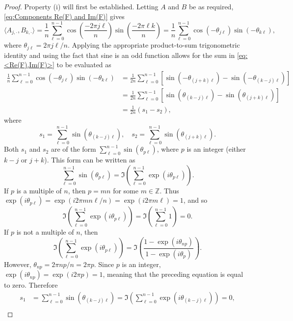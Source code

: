 \begin{proof}
Property (i) will first be established. Letting $A$ and $B$ be as required, \eqref{eq:Components Re(F) and Im(F)} gives
\begin{equation}
\langle A_{j,\cdot}, B_{k,\cdot}\rangle = \frac{1}{n}\sum_{\ell=0}^{n-1}\cos\left(\frac{-2\pi{j\ell}}{n}\right)\sin\left(\frac{-2\pi{\ell{k}}}{n}\right) = \frac{1}{n}\sum_{\ell=0}^{n-1}\cos\left(-\theta_{j\ell}\right)\sin\left(-\theta_{k\ell}\right),
\label{eq: <Re(F),Im(F)>}
\end{equation}
where $\theta_{j\ell} = 2\pi{j\ell}/n$. Applying the appropriate product-to-sum trigonometric identity and using the fact that sine is an odd function allows for the sum in \eqref{eq: <Re(F),Im(F)>} to be evaluated as
\begin{align*}
\frac{1}{n}\sum_{\ell=0}^{n-1}\cos\left(-\theta_{j\ell}\right)\sin\left(-\theta_{k\ell}\right) &= \frac{1}{2n}\sum_{\ell=0}^{n-1}\left[\sin\left(-\theta_{(j+k)\ell}\right) - \sin\left(-\theta_{(k-j)\ell}\right)\right] \\
&= \frac{1}{2n}\sum_{\ell=0}^{n-1}\left[\sin\left(\theta_{(k-j)\ell}\right) - \sin\left(\theta_{(j+k)\ell}\right)\right] \\
&= \frac{1}{2n}\left(s_1 - s_2\right),
\end{align*}
where
\[s_1 = \sum_{\ell=0}^{n-1}\sin\left(\theta_{(k-j)\ell}\right), \quad s_2 = \sum_{\ell=0}^{n-1}\sin\left(\theta_{(j+k)\ell}\right).\]
Both $s_1$ and $s_2$ are of the form $\sum_{\ell=0}^{n-1} \sin(\theta_{p\ell})$, where $p$ is an integer (either $k-j$ or $j+k$). This form can be written as
\[\sum_{\ell=0}^{n-1} \sin\left(\theta_{p\ell}\right) = \Im\left(\sum_{\ell=0}^{n-1} \exp\left(i\theta_{p\ell}\right)\right).\] 
If $p$ is a multiple of $n$, then $p = mn$ for some $m \in \mathbb{Z}$. Thus $\exp(i\theta_{p\ell}) = \exp(i2\pi{mn}\ell/n) = \exp(i2\pi{m\ell}) = 1$, and so
\[\Im\left(\sum_{\ell=0}^{n-1} \exp\left(i\theta_{p\ell}\right)\right) = \Im\left(\sum_{\ell=0}^{n-1} 1\right) = 0.\]
If $p$ is not a multiple of $n$, then
\[\Im\left(\sum_{\ell=0}^{n-1} \exp\left(i\theta_{p\ell}\right)\right) = \Im\left(\frac{1-\exp(i\theta_{np})}{1-\exp(i\theta_p)}\right).\]
However, $\theta_{np} = 2\pi{np}/n = 2\pi{p}$. Since $p$ is an integer, $\exp(i\theta_{np})  =\exp(i2\pi{p}) = 1$, meaning that the preceding equation is equal to zero. Therefore
\begin{align*}
s_1 &= \sum_{\ell=0}^{n-1}\sin\left(\theta_{(k-j)\ell}\right) = \Im\left(\sum_{\ell=0}^{n-1}\exp\left(i\theta_{(k-j)\ell}\right)\right) = 0, \\

\end{align*}
\end{proof}
